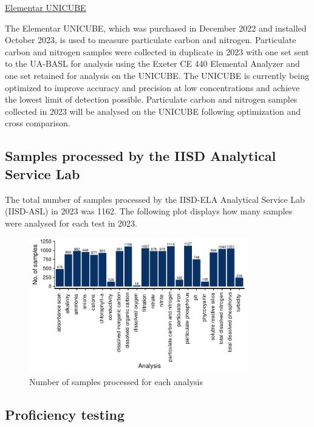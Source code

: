 \documentclass[
]{article}
\begin{document}
\underline{Elementar UNICUBE}

The Elementar UNICUBE, which was purchased in December 2022 and
installed October 2023, is used to measure particulate carbon and
nitrogen. Particulate carbon and nitrogen samples were collected in
duplicate in 2023 with one set sent to the UA-BASL for analysis using
the Exeter CE 440 Elemental Analyzer and one set retained for analysis
on the UNICUBE. The UNICUBE is currently being optimized to improve
accuracy and precision at low concentrations and achieve the lowest
limit of detection possible. Particulate carbon and nitrogen samples
collected in 2023 will be analysed on the UNICUBE following optimization
and cross comparison.

\hypertarget{samples-processed-by-the-iisd-analytical-service-lab}{%
\subsection{Samples processed by the IISD Analytical Service
Lab}\label{samples-processed-by-the-iisd-analytical-service-lab}}

The total number of samples processed by the IISD-ELA Analytical Service
Lab (IISD-ASL) in 2023 was 1162. The following plot displays how many
samples were analysed for each test in 2023.

\begin{figure}[h]
  \includegraphics[width=0.85\textwidth]{test_summary_plot.pdf}
  \caption{Number of samples processed for each analysis}
\end{figure}

\hypertarget{proficiency-testing}{%
\subsection{Proficiency testing}\label{proficiency-testing}}
\end{document}
